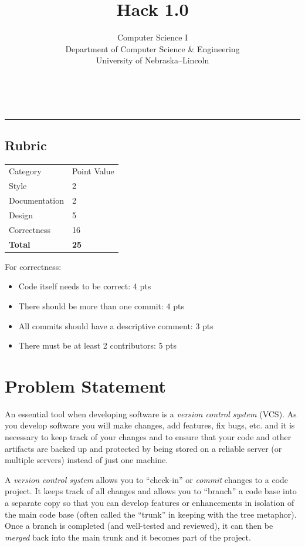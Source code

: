 \documentclass[12pt]{scrartcl}
\title{Hack 1.0}\let\Title\@title
\subtitle{Computer Science I\\
{\small
\vskip1cm
Department of Computer Science \& Engineering \\
University of Nebraska--Lincoln}
\vskip-1cm}
\date{~}
\begin{document}
\maketitle

\hrule



\subsection*{Rubric}
\begin{table}[H]
\begin{tabular}{ll}
Category       & Point Value \\
Style          & 2           \\
Documentation  & 2           \\
Design         & 5           \\
Correctness    & 16          \\
\textbf{Total} & \textbf{25}
\end{tabular}
\end{table}

For correctness:
\begin{itemize}
  \item Code itself needs to be correct: 4 pts
  \item There should be more than one commit: 4 pts
  \item All commits should have a descriptive comment: 3 pts
  \item There must be at least 2 contributors: 5 pts
\end{itemize}


\section*{Problem Statement}

An essential tool when developing software is a \emph{version control system}
(VCS).  As you develop software you will make changes, add features, fix bugs, etc.
and it is necessary to keep track of your changes and to ensure that your 
code and other artifacts are backed up and protected by being stored on a 
reliable server (or multiple servers) instead of just one machine.  

A \emph{version control system} allows you to ``check-in'' or 
\emph{commit} changes to a code project.  It keeps track of all changes 
and allows you to ``branch'' a code base into a separate copy so that 
you can develop features or enhancements in isolation of the
main code base (often called the ``trunk'' in keeping with the tree 
metaphor).  Once a branch is completed (and well-tested and 
reviewed), it can then be \emph{merged} back into the main trunk 
and it becomes part of the project.
\end{document}
